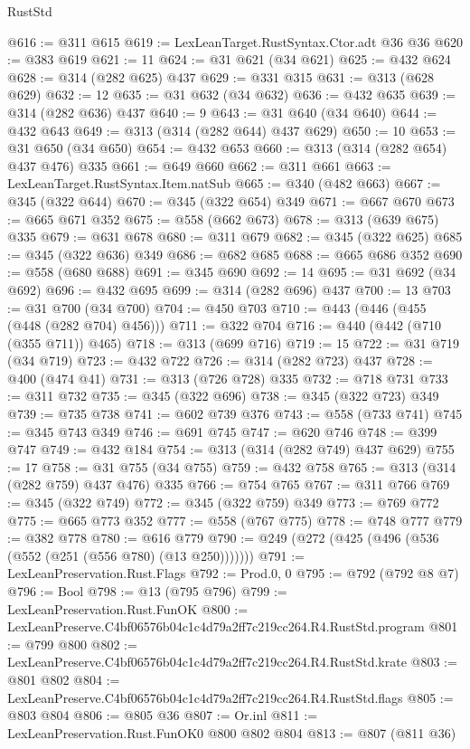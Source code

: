 \begin{lexlean}{RustStd}
\begin{coremodule}
@616 := @311 @615
@619 := LexLeanTarget.RustSyntax.Ctor.adt @36 @36
@620 := @383 @619
@621 := 11
@624 := @31 @621 (@34 @621)
@625 := @432 @624
@628 := @314 (@282 @625) @437
@629 := @331 @315
@631 := @313 (@628 @629)
@632 := 12
@635 := @31 @632 (@34 @632)
@636 := @432 @635
@639 := @314 (@282 @636) @437
@640 := 9
@643 := @31 @640 (@34 @640)
@644 := @432 @643
@649 := @313 (@314 (@282 @644) @437 @629)
@650 := 10
@653 := @31 @650 (@34 @650)
@654 := @432 @653
@660 := @313 (@314 (@282 @654) @437 @476) @335
@661 := @649 @660
@662 := @311 @661
@663 := LexLeanTarget.RustSyntax.Item.natSub
@665 := @340 (@482 @663)
@667 := @345 (@322 @644)
@670 := @345 (@322 @654) @349
@671 := @667 @670
@673 := @665 @671 @352
@675 := @558 (@662 @673)
@678 := @313 (@639 @675) @335
@679 := @631 @678
@680 := @311 @679
@682 := @345 (@322 @625)
@685 := @345 (@322 @636) @349
@686 := @682 @685
@688 := @665 @686 @352
@690 := @558 (@680 @688)
@691 := @345 @690
@692 := 14
@695 := @31 @692 (@34 @692)
@696 := @432 @695
@699 := @314 (@282 @696) @437
@700 := 13
@703 := @31 @700 (@34 @700)
@704 := @450 @703
@710 := @443 (@446 (@455 (@448 (@282 @704) @456)))
@711 := @322 @704
@716 := @440 (@442 (@710 (@355 @711)) @465)
@718 := @313 (@699 @716)
@719 := 15
@722 := @31 @719 (@34 @719)
@723 := @432 @722
@726 := @314 (@282 @723) @437
@728 := @400 (@474 @41)
@731 := @313 (@726 @728) @335
@732 := @718 @731
@733 := @311 @732
@735 := @345 (@322 @696)
@738 := @345 (@322 @723) @349
@739 := @735 @738
@741 := @602 @739 @376
@743 := @558 (@733 @741)
@745 := @345 @743 @349
@746 := @691 @745
@747 := @620 @746
@748 := @399 @747
@749 := @432 @184
@754 := @313 (@314 (@282 @749) @437 @629)
@755 := 17
@758 := @31 @755 (@34 @755)
@759 := @432 @758
@765 := @313 (@314 (@282 @759) @437 @476) @335
@766 := @754 @765
@767 := @311 @766
@769 := @345 (@322 @749)
@772 := @345 (@322 @759) @349
@773 := @769 @772
@775 := @665 @773 @352
@777 := @558 (@767 @775)
@778 := @748 @777
@779 := @382 @778
@780 := @616 @779
@790 := @249 (@272 (@425 (@496 (@536 (@552 (@251 (@556 @780) (@13 @250)))))))
@791 := LexLeanPreservation.Rust.Flags
@792 := Prod.{0, 0}
@795 := @792 (@792 @8 @7)
@796 := Bool
@798 := @13 (@795 @796)
@799 := LexLeanPreservation.Rust.FunOK
@800 := LexLeanPreserve.C4bf06576b04c1c4d79a2ff7c219cc264.R4.RustStd.program
@801 := @799 @800
@802 := LexLeanPreserve.C4bf06576b04c1c4d79a2ff7c219cc264.R4.RustStd.krate
@803 := @801 @802
@804 := LexLeanPreserve.C4bf06576b04c1c4d79a2ff7c219cc264.R4.RustStd.flags
@805 := @803 @804
@806 := @805 @36
@807 := Or.inl
@811 := LexLeanPreservation.Rust.FunOK0 @800 @802 @804
@813 := @807 (@811 @36)

\end{coremodule}
\end{lexlean}
